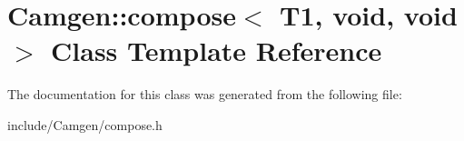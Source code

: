 \hypertarget{a00092}{}\section{Camgen\+:\+:compose$<$ T1, void, void $>$ Class Template Reference}
\label{a00092}


The documentation for this class was generated from the following file\+:\begin{DoxyCompactItemize}
\item 
include/\+Camgen/compose.\+h\end{DoxyCompactItemize}
